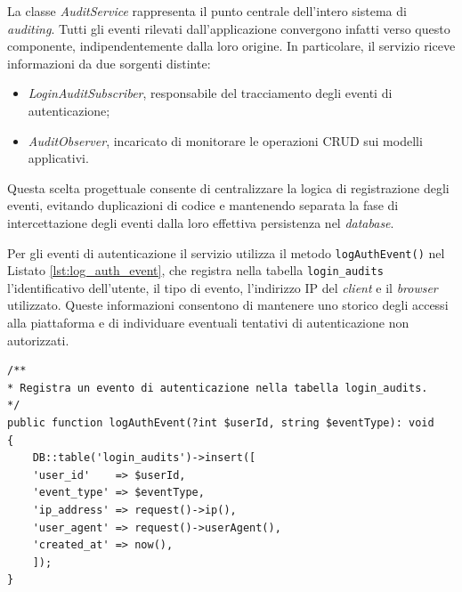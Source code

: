 La classe \textit{AuditService} rappresenta il punto centrale dell'intero sistema di \textit{auditing}. Tutti gli eventi rilevati dall'applicazione convergono infatti verso questo componente, indipendentemente dalla loro origine.
In particolare, il servizio riceve informazioni da due sorgenti distinte:
\begin{itemize}
	\item \textit{LoginAuditSubscriber}, responsabile del tracciamento degli eventi di autenticazione;
	\item \textit{AuditObserver}, incaricato di monitorare le operazioni CRUD sui modelli applicativi.
\end{itemize}

Questa scelta progettuale consente di centralizzare la logica di registrazione degli eventi, evitando duplicazioni di codice e mantenendo separata la fase di intercettazione degli eventi dalla loro effettiva persistenza nel \textit{database}.

Per gli eventi di autenticazione il servizio utilizza il metodo \texttt{logAuthEvent()} nel Listato \ref{lst:log_auth_event}, che registra nella tabella \texttt{login\_audits} l'identificativo dell'utente, il tipo di evento, l'indirizzo IP del \textit{client} e il \textit{browser} utilizzato. Queste informazioni consentono di mantenere uno storico degli accessi alla piattaforma e di individuare eventuali tentativi di autenticazione non autorizzati.

\begin{lstlisting}[float=!t, caption={Registrazione di un evento di autenticazione nella tabella \textit{login\_audits}.}, captionpos=b, label={lst:log_auth_event}, basicstyle=\ttfamily\footnotesize, lineskip=-1pt, breaklines=true, breakatwhitespace=true]
/**
* Registra un evento di autenticazione nella tabella login_audits.
*/
public function logAuthEvent(?int $userId, string $eventType): void
{
	DB::table('login_audits')->insert([
	'user_id'    => $userId,
	'event_type' => $eventType,
	'ip_address' => request()->ip(),
	'user_agent' => request()->userAgent(),
	'created_at' => now(),
	]);
}
\end{lstlisting}

